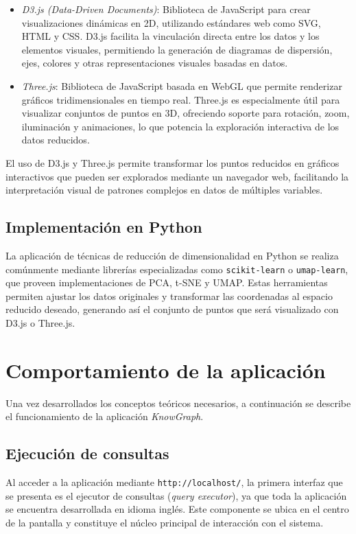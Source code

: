 \documentclass{article}
\begin{document}
\begin{itemize}
    \item \textit{D3.js (Data-Driven Documents)}: Biblioteca de JavaScript para crear visualizaciones dinámicas en 2D, utilizando estándares web como SVG, HTML y CSS. D3.js facilita la vinculación directa entre los datos y los elementos visuales, permitiendo la generación de diagramas de dispersión, ejes, colores y otras representaciones visuales basadas en datos.
    \item \textit{Three.js}: Biblioteca de JavaScript basada en WebGL que permite renderizar gráficos tridimensionales en tiempo real. Three.js es especialmente útil para visualizar conjuntos de puntos en 3D, ofreciendo soporte para rotación, zoom, iluminación y animaciones, lo que potencia la exploración interactiva de los datos reducidos.
\end{itemize}

El uso de D3.js y Three.js permite transformar los puntos reducidos en gráficos interactivos que pueden ser explorados mediante un navegador web, facilitando la interpretación visual de patrones complejos en datos de múltiples variables.

\subsection{Implementación en Python}

La aplicación de técnicas de reducción de dimensionalidad en Python se realiza comúnmente mediante librerías especializadas como \texttt{scikit-learn} o \texttt{umap-learn}, que proveen implementaciones de PCA, t-SNE y UMAP. Estas herramientas permiten ajustar los datos originales y transformar las coordenadas al espacio reducido deseado, generando así el conjunto de puntos que será visualizado con D3.js o Three.js.



\section{Comportamiento de la aplicación}
Una vez desarrollados los conceptos teóricos necesarios, a continuación se describe el funcionamiento de la aplicación \textit{KnowGraph}.


\subsection{Ejecución de consultas}

Al acceder a la aplicación mediante \texttt{http://localhost/}, la primera interfaz que se presenta es el ejecutor de consultas (\textit{query executor}), ya que toda la aplicación se encuentra desarrollada en idioma inglés. Este componente se ubica en el centro de la pantalla y constituye el núcleo principal de interacción con el sistema.
\end{document}
